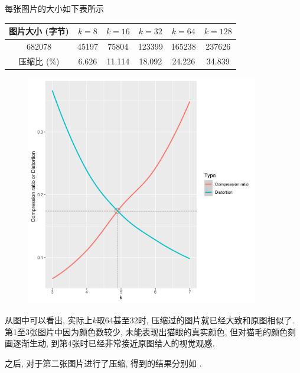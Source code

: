 \documentclass[lang=cn,11pt]{elegantpaper}
\begin{document}
每张图片的大小如下表所示
\begin{table}[h]
    \centering
    \begin{tabular}{c|ccccc}
    \hline
    图片大小 (字节)  & $k=8$   & $k=16$   & $k=32$   & $k=64$   & $k=128$  \\ \hline
    682078   & 45197 & 75804  & 123399 & 165238 & 237626 \\
    压缩比 (\%) & 6.626 & 11.114 & 18.092 & 24.226 & 34.839 \\ \hline
    \end{tabular}
\end{table}

\begin{figure}[ht]
\centering
  \includegraphics[width=0.9\textwidth]{cat1to}
  \caption{\label{cat2tradeoff}}
\end{figure}




从图中可以看出, 实际上$k$取64甚至32时, 压缩过的图片就已经大致和原图相似了. 第1至3张图片中因为颜色数较少, 未能表现出猫眼的真实颜色, 但对猫毛的颜色刻画逐渐生动, 到第4张时已经非常接近原图给人的视觉观感. 

之后, 对于第二张图片进行了压缩, 得到的结果分别如 .
\end{document}
